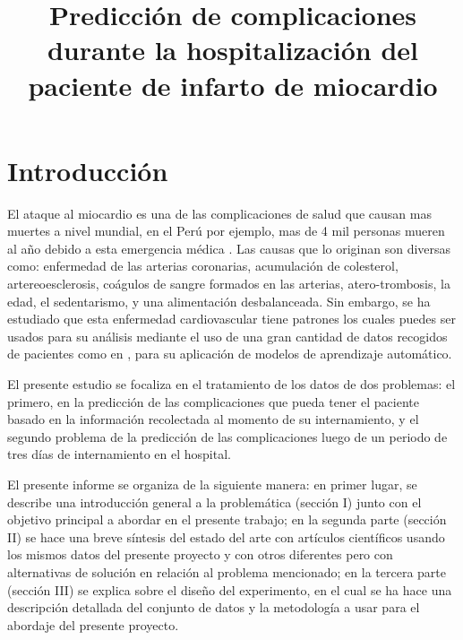 \documentclass[conference]{IEEEtran}
\begin{document}
\title{Predicción de complicaciones durante la hospitalización del paciente de infarto de miocardio}


\author{
\and
{}
\and
{}
}

\maketitle

\section{Introducción}
El ataque al miocardio es una de las complicaciones de salud que causan mas muertes a nivel mundial, en el Perú por ejemplo, mas de 4 mil personas mueren al año debido a esta emergencia médica \cite{b2}. Las causas que lo originan son diversas como: enfermedad de las arterias coronarias, acumulación de colesterol, artereoesclerosis, coágulos de sangre formados en las arterias, atero-trombosis, la edad, el sedentarismo, y una alimentación desbalanceada. Sin embargo, se ha estudiado que esta enfermedad cardiovascular tiene patrones los cuales puedes ser usados para su análisis mediante  el uso de una gran cantidad de datos recogidos de pacientes como en \cite{b1}, para su aplicación de modelos de aprendizaje automático. 

El presente estudio se focaliza en el tratamiento de los datos de dos problemas: el primero, en la predicción de las complicaciones que pueda tener el paciente basado en la información recolectada al momento de su internamiento, y el segundo problema de la predicción de las complicaciones luego de un periodo de tres días de internamiento en el hospital.

El presente informe se organiza de la siguiente manera: en primer lugar, se describe una introducción general a la problemática (sección I) junto con el objetivo principal a abordar en el presente trabajo; en la segunda parte (sección II) se hace una breve síntesis del estado del arte con artículos científicos usando los mismos datos del presente proyecto y con otros diferentes pero con alternativas de solución en relación al problema mencionado; en la tercera parte (sección III) se explica sobre el diseño del experimento, en el cual se ha hace una descripción detallada del conjunto de datos y la metodología a usar para el abordaje del presente proyecto.
\end{document}
